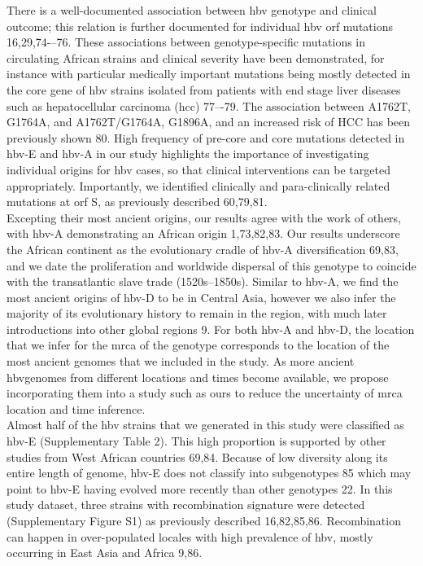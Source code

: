 There is a well-documented association between \gls{hbv} genotype and clinical outcome; this relation is further documented for individual \gls{hbv} \gls{orf} mutations 16,29,74-–76.
These associations between genotype-specific mutations in circulating African strains and clinical severity have been demonstrated, for instance with particular medically important mutations being mostly detected in the core gene of \gls{hbv} strains isolated from patients with end stage liver diseases such as hepatocellular carcinoma (\gls{hcc}) 77–-79.
The association between A1762T, G1764A, and A1762T/G1764A, G1896A, and an increased risk of HCC has been previously shown 80.
High frequency of pre-core and core mutations detected in \gls{hbv}-E and \gls{hbv}-A in our study highlights the importance of investigating individual origins for \gls{hbv} cases, so that clinical interventions can be targeted appropriately.
Importantly, we identified clinically and para-clinically related mutations at \gls{orf} S, as previously described 60,79,81.\\

Excepting their most ancient origins, our results agree with the work of others, with \gls{hbv}-A demonstrating an African origin 1,73,82,83.
Our results underscore the African continent as the evolutionary cradle of \gls{hbv}-A diversification 69,83, and we date the proliferation and worldwide dispersal of this genotype to coincide with the transatlantic slave trade (1520s--1850s).
Similar to \gls{hbv}-A, we find the most ancient origins of \gls{hbv}-D to be in Central Asia, however we also infer the majority of its evolutionary history to remain in the region, with much later introductions into other global regions 9.
For both \gls{hbv}-A and \gls{hbv}-D, the location that we infer for the \gls{mrca} of the genotype corresponds to the location of the most ancient genomes that we included in the study.
As more ancient \gls{hbv}genomes from different locations and times become available, we propose incorporating them into a study such as ours to reduce the uncertainty of \gls{mrca} location and time inference.\\

Almost half of the \gls{hbv} strains that we generated in this study were classified as \gls{hbv}-E (Supplementary Table 2).
This high proportion is supported by other studies from West African countries 69,84.
Because of low diversity along its entire length of genome, \gls{hbv}-E does not classify into subgenotypes 85 which may point to \gls{hbv}-E having evolved more recently than other genotypes 22.
In this study dataset, three strains with recombination signature were detected (Supplementary Figure S1) as previously described 16,82,85,86.
Recombination can happen in over-populated locales with high prevalence of \gls{hbv}, mostly occurring in East Asia and Africa 9,86.\\

